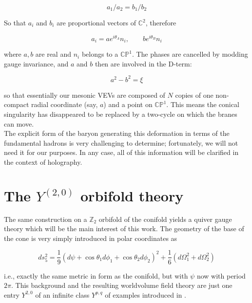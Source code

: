 \begin{equation}
	a_1/a_2 = b_1/b_2
	\label{}
\end{equation}

So that $a_i$ and $b_i$ are proportional vectors of $\mathbb{C}^2$, therefore

\begin{equation}
	a_i = a e^{i\theta_A} n_i, \quad \quad b e^{i\theta_B} n_i
	\label{}
\end{equation}

where $a,b$ are real and $n_i$ belongs to a $\mathbb{CP}^1$. The phases are cancelled by modding gauge invariance, and $a$ and $b$ then are involved in the D-term:

\begin{equation}
	a^2 - b^2 = \xi
	\label{}
\end{equation}

so that essentially our mesonic VEVs are composed of $N$ copies of one non-compact radial coordinate (say, $a$) and a point on $\mathbb{CP}^1$. This means the conical singularity has disappeared to be replaced by a two-cycle on which the branes can move.\\

The explicit form of the baryon generating this deformation in terms of the fundamental hadrons is very challenging to determine\cite{Forcella}; fortunately, we will not need it for our purposes. In any case, all of this information will be clarified in the context of holography.

\section{The $Y^{(2,0)}$ orbifold theory}\label{sec:squares}

The same construction on a $\mathbb{Z}_2$ orbifold of the conifold yields a quiver gauge theory which will be the main interest of this work. The geometry of the base of the cone is very simply introduced in polar coordinates as 

\begin{equation}
	ds^2_5 = \frac{1}{9} (d\psi + \cos\theta_1 d\phi_1 + \cos\theta_2 d\phi_2)^2 + \frac{1}{6} (d\Omega_1^2 + d\Omega_2^2)
\end{equation}

i.e., exactly the same metric in form as the conifold, but with $\psi$ now with period $2\pi$. This background and the resulting worldvolume field theory are just one entry $Y^{2,0}$ of an infinite class $Y^{p,q}$ of examples introduced in \cite{benvenutiInfinite}.\\

